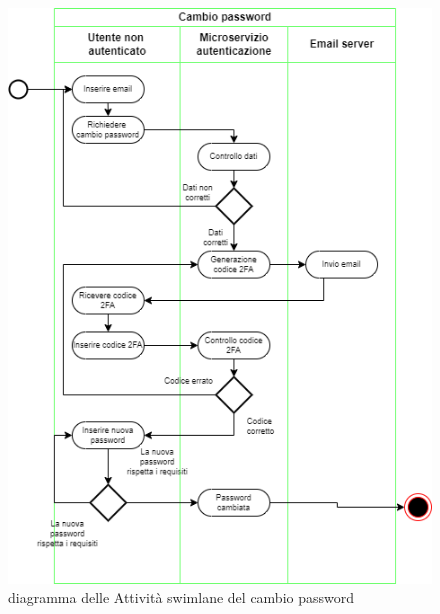 \documentclass{report}
\begin{document}
\begin{figure}[H]
	\centering\includegraphics[width=1\textwidth]{images/password_change_swimlane.drawio.png}
	diagramma delle Attività swimlane del cambio password
\end{figure}
\end{document}
